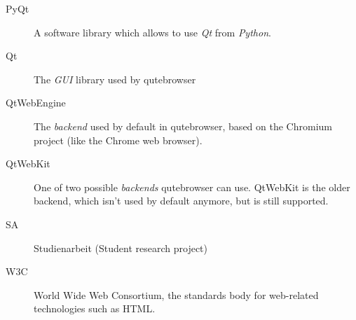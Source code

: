 \documentclass[a4paper,parskip=full]{scrreprt}
\begin{document}
\begin{appendices}
\begin{description}
  \item[PyQt]{A software library which allows to use \emph{Qt} from \emph{Python}.}
  \item[Qt]{The \emph{GUI} library used by qutebrowser}
  \item[QtWebEngine]{The \emph{backend} used by default in qutebrowser, based on
      the Chromium project (like the Chrome web browser).}
  \item[QtWebKit]{One of two possible \emph{backends} qutebrowser can use.
      QtWebKit is the older backend, which isn't used by default anymore, but is
      still supported.}
  \item[SA]{Studienarbeit (Student research project)}
  \item[W3C]{World Wide Web Consortium, the standards body for web-related
      technologies such as HTML.}
\end{description}

\nocite{yapproach}
\renewcommand{\bibname}{\chapter{Literature and Sources}}


\end{appendices}
\end{document}

